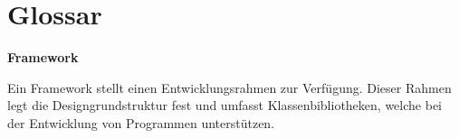 \chapter*{Glossar}

\textbf{Framework}
\begin{adjustwidth}{1.5em}{}
	Ein Framework stellt einen Entwicklungsrahmen zur Verfügung. Dieser Rahmen legt die Designgrundstruktur fest und umfasst Klassenbibliotheken, welche bei der Entwicklung von Programmen unterstützen. 
\end{adjustwidth} \bigskip
